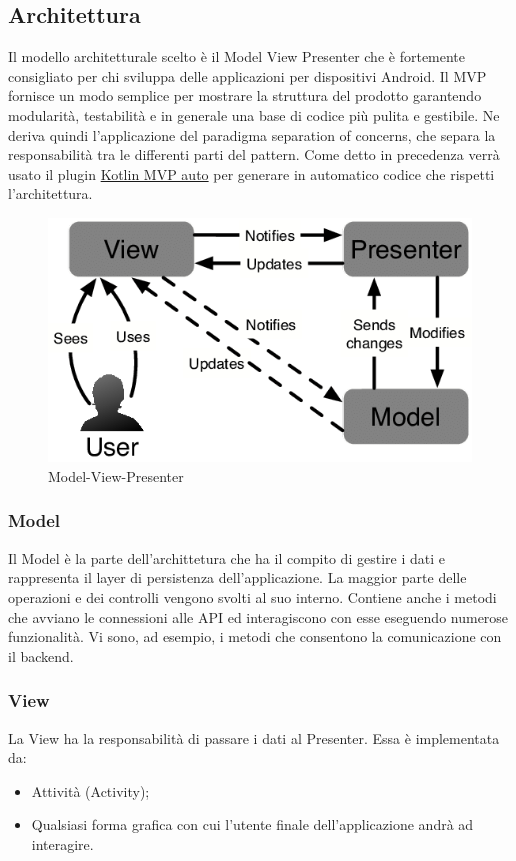 \subsection{Architettura}
Il modello architetturale scelto è il Model View Presenter che è fortemente consigliato per chi sviluppa delle applicazioni per dispositivi Android. Il MVP fornisce un modo semplice per mostrare la struttura del prodotto garantendo modularità, testabilità e in generale una base di codice più pulita e gestibile. Ne deriva quindi l'applicazione del paradigma separation of concerns, che separa la responsabilità tra le differenti parti del pattern.
Come detto in precedenza verrà usato il plugin \href{https://git-scm.com/downloads}{Kotlin MVP auto} per generare in automatico codice che rispetti l'architettura.
\begin{figure}[H]
	\centering
	\includegraphics[width=16cm]{res/images/mvp.png}
	\caption{Model-View-Presenter}
	\label{fig:Model-View-Presenter}
\end{figure}

\subsubsection{Model}
Il Model è la parte dell'archittetura che ha il compito di gestire i dati e rappresenta il layer di persistenza dell'applicazione. La maggior parte delle operazioni e dei controlli vengono svolti al suo interno. Contiene anche i metodi che avviano le connessioni alle API ed interagiscono con esse eseguendo numerose funzionalità. Vi sono, ad esempio, i metodi che consentono la comunicazione con il backend.


\subsubsection{View}
La View ha la responsabilità di passare i dati al Presenter. Essa è implementata da:
\begin{itemize}
	\item Attività (Activity); \\
	\item Qualsiasi forma grafica con cui l'utente finale dell'applicazione andrà ad interagire. \\	
\end{itemize}

